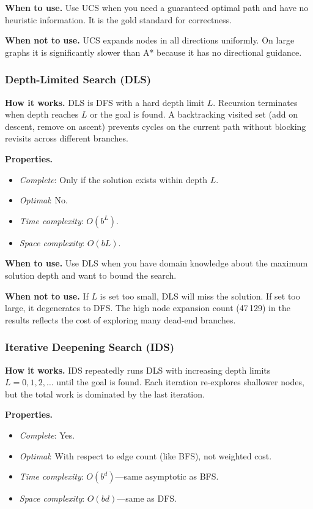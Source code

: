 ﻿\documentclass[a4paper, 12pt]{article}
\theoremstyle{remark}
\begin{document}
\textbf{When to use.} Use UCS when you need a guaranteed optimal path and have no heuristic information. It is the gold standard for correctness.

\textbf{When not to use.} UCS expands nodes in all directions uniformly. On large graphs it is significantly slower than A* because it has no directional guidance.

\subsubsection{Depth-Limited Search (DLS)}

\textbf{How it works.} DLS is DFS with a hard depth limit $L$. Recursion terminates when depth reaches $L$ or the goal is found. A backtracking visited set (add on descent, remove on ascent) prevents cycles on the current path without blocking revisits across different branches.

\textbf{Properties.}
\begin{itemize}
    \item \emph{Complete}: Only if the solution exists within depth $L$.
    \item \emph{Optimal}: No.
    \item \emph{Time complexity}: $O(b^L)$.
    \item \emph{Space complexity}: $O(bL)$.
\end{itemize}

\textbf{When to use.} Use DLS when you have domain knowledge about the maximum solution depth and want to bound the search.

\textbf{When not to use.} If $L$ is set too small, DLS will miss the solution. If set too large, it degenerates to DFS. The high node expansion count (47\,129) in the results reflects the cost of exploring many dead-end branches.

\subsubsection{Iterative Deepening Search (IDS)}

\textbf{How it works.} IDS repeatedly runs DLS with increasing depth limits $L = 0, 1, 2, \ldots$ until the goal is found. Each iteration re-explores shallower nodes, but the total work is dominated by the last iteration.

\textbf{Properties.}
\begin{itemize}
    \item \emph{Complete}: Yes.
    \item \emph{Optimal}: With respect to edge count (like BFS), not weighted cost.
    \item \emph{Time complexity}: $O(b^d)$---same asymptotic as BFS.
    \item \emph{Space complexity}: $O(bd)$---same as DFS.
\end{itemize}
\end{document}
